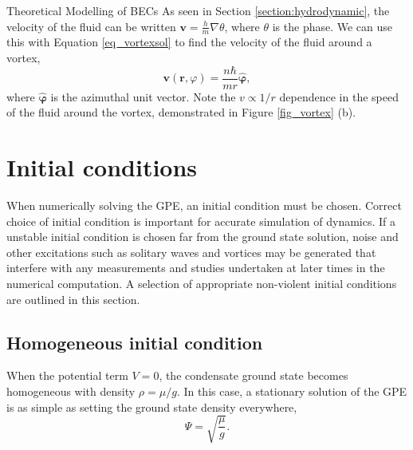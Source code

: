 \begin{chapter}{\label{cha:theoretical_model}Theoretical Modelling of BECs}
As seen in Section \ref{section:hydrodynamic}, the velocity of the fluid can be written $\mathbf{v} = \frac{h}{m}\nabla\theta$, where $\theta$ is the phase. We can use this with Equation \ref{eq_vortexsol} to find the velocity of the fluid around a vortex,
	\begin{equation}\label{eq_vortexvel}
	\mathbf{v}(\mathbf{r},\varphi) = \frac{n \hbar}{mr} {\bm{\hat{\varphi}}},
	\end{equation}
where ${\bm{\hat{\varphi}}}$ is the azimuthal unit vector. Note the $v \propto 1/r$ dependence in the speed of the fluid around the vortex, demonstrated in Figure \ref{fig_vortex} (b). 

\section{\label{section:inital} Initial conditions}
	When numerically solving the GPE, an initial condition must be chosen. Correct choice of initial condition is important for accurate simulation of dynamics. If a unstable initial condition is chosen far from the ground state solution, noise and other excitations such as solitary waves and vortices may be generated that interfere with any measurements and studies undertaken at later times in the numerical computation. A selection of appropriate non-violent initial conditions are outlined in this section. 
	\subsection{\label{section:homoinit} Homogeneous initial condition}
	When the potential term $V=0$, the condensate ground state becomes homogeneous with density $\rho=\mu/g$. In this case, a stationary solution of the GPE is as simple as setting the ground state density everywhere,
	\begin{equation}
		\Psi = \sqrt{\frac{\mu}{g}}.
		\label{eq:homoinit}
	\end{equation}


\end{chapter}
